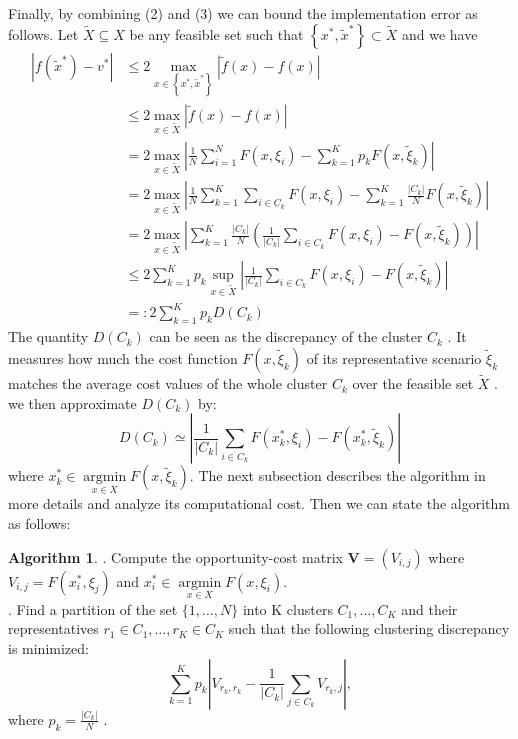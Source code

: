 \documentclass{article}
\theoremstyle{plain}
\theoremstyle{definition}
\newtheorem{algorithm}[theorem]{Algorithm}
\begin{document}
Finally, by combining (2) and (3) we can bound the implementation error as follows. Let  $\widetilde{X} \subseteq X$  be any feasible set such that  $\left\{x^{*}, \widetilde{x}^{*}\right\} \subset \widetilde{X}$ and we have 
\begin{equation}
\begin{aligned}
\left|f\left(\widetilde{x}^{*}\right)-v^{*}\right| & \leq 2 \max _{x \in\left\{x^{*}, \widetilde{x}^{*}\right\}}|\tilde{f}(x)-f(x)| \\
& \leq 2 \max _{x \in \widetilde{X}}|\tilde{f}(x)-f(x)| \\
&=2 \max _{x \in \widetilde{X}}\left|\frac{1}{N} \sum_{i=1}^{N} F\left(x, \xi_{i}\right)-\sum_{k=1}^{K} p_{k} F\left(x, \widetilde{\xi}_{k}\right)\right| \\
&=2 \max _{x \in \widetilde{X}}\left|\frac{1}{N} \sum_{k=1}^{K} \sum_{i \in C_{k}} F\left(x, \xi_{i}\right)-\sum_{k=1}^{K} \frac{\left|C_{k}\right|}{N} F\left(x, \widetilde{\xi}_{k}\right)\right| \\
&=2 \max _{x \in \widetilde{X}}\left|\sum_{k=1}^{K} \frac{\left|C_{k}\right|}{N}\left(\frac{1}{\left|C_{k}\right|} \sum_{i \in C_{k}} F\left(x, \xi_{i}\right)-F\left(x, \widetilde{\xi}_{k}\right)\right)\right| \\
& \leq 2 \sum_{k=1}^{K} p_{k} \sup _{x \in \widetilde{X}}\left|\frac{1}{\left|C_{k}\right|} \sum_{i \in C_{k}} F\left(x, \xi_{i}\right)-F\left(x, \widetilde{\xi}_{k}\right)\right| \\
&=: 2 \sum_{k=1}^{K} p_{k} D\left(C_{k}\right)
\end{aligned}
\end{equation}
The quantity  $D\left(C_{k}\right)$  can be seen as the discrepancy of the cluster  $C_{k}$ . It measures how much the cost function $ F(x, \widetilde{\xi}_{k})$  of its representative scenario  $\widetilde{\xi}_{k}$  matches the average cost values of the whole cluster  $C_{k}$  over the feasible set  $\tilde{X}$ .  we then approximate  $D\left(C_{k}\right)$  by:
$$
D\left(C_{k}\right) \simeq\left|\frac{1}{\left|C_{k}\right|} \sum_{i \in C_{k}} F\left(x_{k}^{*}, \xi_{i}\right)-F\left(x_{k}^{*}, \widetilde{\xi}_{k}\right)\right|
$$
where $ x_{k}^{*} \in   \underset{x \in X}{\operatorname{argmin}} F(x, \widetilde{\xi}_{k}) $. The next subsection describes the algorithm in more details and analyze its computational cost. Then we can state the algorithm as follows:\\

\begin{algorithm}
. Compute the opportunity-cost matrix $\boldsymbol{V}=\left(V_{i, j}\right) $ where $V_{i, j}=F\left(x_{i}^{*}, \xi_{j}\right)$ and  $x_{i}^{*} \in \underset{x \in X}{\operatorname{argmin}} F\left(x, \xi_{i}\right)$.\\
. Find a partition of the set  $\{1, \ldots, N\}$  into  K  clusters  $C_{1}, \ldots, C_{K}$  and their representatives  $r_{1} \in C_{1}, \ldots, r_{K} \in C_{K}$  such that the following clustering discrepancy is minimized: 
$$\sum_{k=1}^{K} p_{k}\left|V_{r_{k}, r_{k}}-\frac{1}{\left|C_{k}\right|} \sum_{j \in C_{k}} V_{r_{k}, j}\right|,$$
where  $p_{k}=\frac{\left|C_{k}\right|}{N}$ .\end{algorithm}
\end{document}
